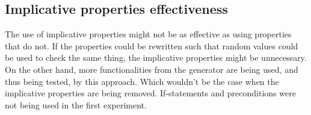 \subsection*{Implicative properties effectiveness}
The use of implicative properties might not be as effective as using properties
that do not. If the properties could be rewritten such that random values could
be used to check the same thing, the implicative properties might be
unnecessary. On the other hand, more functionalities from the generator are
being used, and thus being tested, by this approach. Which wouldn't be the case
when the implicative properties are being removed. If-statements and
preconditions were not being used in the first experiment.

